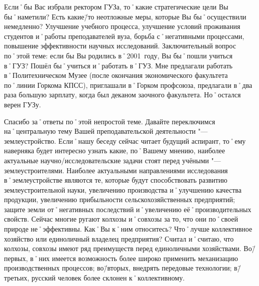 \begin{drama}
	\maxspeaks Если˚бы Вас избрали ректором ГУЗа, то˚какие стратегические цели Вы бы˚наметили? Есть какие\=/то неотложные меры, которые Вы бы˚осуществили немедленно?
	\michaelspeaks Улучшение учебного процесса, улучшение условий проживания студентов и˚работы преподавателей вуза, борьба с˚негативными процессами, повышение эффективности научных исследований.
	\maxspeaks Заключительный вопрос по˚этой теме: если бы Вы родились в˚2001~году, Вы бы˚пошли учиться в˚ГУЗ?
	\michaelspeaks Пошёл бы˚учиться и˚работать в˚ГУЗ. Мне предлагали работать в˚Политехническом Музее (после окончания экономического факультета по˚линии Горкома КПСС), приглашали в˚Горком профсоюза, предлагали в˚два раза большую зарплату, когда был деканом заочного факультета. Но˚остался верен ГУЗу.

	\maxspeaks Спасибо за˚ответы по˚этой непростой теме. Давайте переключимся на˚центральную тему Вашей преподавательской деятельности "--- землеустройство.
Если˚нашу беседу сейчас читает будущий аспирант, то˚ему наверняка будет интересно узнать какие, по˚Вашему мнению, наиболее актуальные научно\-/исследовательские задачи стоят перед учёными "--- землеустроителями.
	\michaelspeaks Наиболее актуальными направлениями исследования в˚землеустройстве являются те, которые будут способствовать развитию землеустроительной науки, увеличению производства и˚улучшению качества продукции, увеличению прибыльности сельскохозяйственных предприятий; защите земли от˚негативных последствий и˚увеличению её˚производительных свойств.
	\maxspeaks Сейчас многие ругают колхозы и˚совхозы за то, что они по˚своей природе не˚эффективны. Как˚Вы к˚ним относитесь? Что˚лучше коллективное хозяйство или единоличный владелец предприятия?
	\michaelspeaks Считал и˚считаю, что колхозы, совхозы имеют ряд преимуществ перед единоличными хозяйствами. Во\=/первых, в˚них имеется возможность более широко применить механизацию производственных процессов; во\=/вторых, внедрять передовые технологии; в\=/третьих, русский человек более склонен к˚коллективному.


\end{drama}
